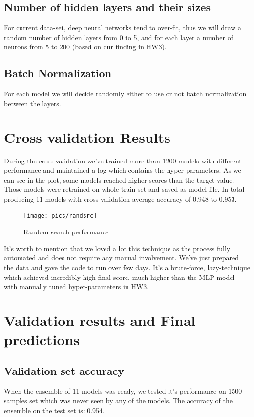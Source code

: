 \documentclass[12pt]{article}
\begin{document}
\subsection{Number of hidden layers and their sizes}
For current data-set, deep neural networks tend to over-fit, thus we will draw a random number of hidden layers from 0 to 5, and for each layer a number of neurons from 5 to 200 (based on our finding in HW3).
\subsection{Batch Normalization}
For each model we will decide randomly either to use or not batch normalization between the layers. 

\newpage
\section{Cross validation Results}
During the cross validation we've trained more than 1200 models with different performance and maintained a log which contains the hyper parameters. As we can see in the plot, some models reached higher scores than the target value. Those models were retrained on whole train set and saved as model file. In total producing 11 models with cross validation average accuracy of 0.948 to 0.953.

\begin{figure}[h]
\centering
\texttt{[image: pics/randsrc]}
\caption{Random search performance}
\end{figure} 

It's worth to mention that we loved a lot this technique as the process fully automated and does not require any manual involvement. We've just prepared the data and gave the code to run over few days. It's a brute-force, lazy-technique which achieved incredibly high final score, much higher than the MLP model with manually tuned hyper-parameters in HW3. 

\newpage
\section{Validation results and Final predictions}
\subsection{Validation set accuracy}
When the ensemble of 11 models was ready, we tested it's performance on 1500 samples set which was never seen by any of the models. The accuracy of the ensemble on the test set is: 0.954.
\end{document}

